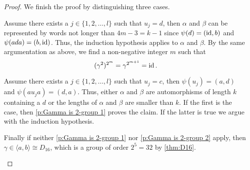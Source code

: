 \begin{proof}
We finish the proof by distinguishing three cases.
\begin{clist}
\item \label{p:Gamma is 2-group 1} Assume there exists a $j\in\lbrace 1,2,\ldots,l\rbrace$ such that $u_j=d$, then $\alpha$ and $\beta$ can be represented by words not longer than $4m-3=k-1$ since $\psi(d)=(\operatorname{id},b)$ and $\psi(ada)=(b,\operatorname{id})$. Thus, the induction hypothesis applies to $\alpha$ and $\beta$. By the same argumentation as above, we find a non-negative integer $m$ such that 
\begin{equation*}
(\gamma^2)^{2^m}=\gamma^{2^{m+1}}=\operatorname{id}.
\end{equation*}
\item \label{p:Gamma is 2-group 2} Assume there exists a $j\in\lbrace 1,2,\ldots,l\rbrace$ such that $u_j=c$, then $\psi(u_j)=(a,d)$ and $\psi(au_ja)=(d,a)$. Thus,  either $\alpha$ and $\beta$ are automorphisms of length $k$ containing a $d$ or the lengths of $\alpha$ and $\beta$ are smaller than $k$. If the first is the case, then \ref{p:Gamma is 2-group 1} proves the claim. If the latter is true we argue with the induction hypothesis.
\item Finally if neither \ref{p:Gamma is 2-group 1} nor \ref{p:Gamma is 2-group 2} apply, then $\gamma\in\langle a,b\rangle\cong D_{16}$, which is a group of order $2^5=32$ by \cref{thm:D16}.
\end{clist}
\end{proof}